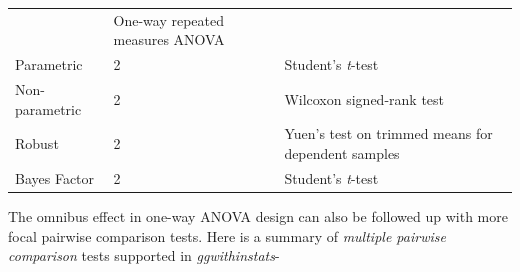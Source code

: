 \documentclass[]{article}
\begin{document}
\begin{longtable}[]{@{}lll@{}}
\begin{minipage}[t]{0.07\columnwidth}
\end{minipage} & \begin{minipage}[t]{0.59\columnwidth}\raggedright
One-way repeated measures ANOVA\strut
\end{minipage}\tabularnewline
\begin{minipage}[t]{0.26\columnwidth}\raggedright
Parametric\strut
\end{minipage} & \begin{minipage}[t]{0.07\columnwidth}\raggedright
2\strut
\end{minipage} & \begin{minipage}[t]{0.59\columnwidth}\raggedright
Student's \emph{t}-test\strut
\end{minipage}\tabularnewline
\begin{minipage}[t]{0.26\columnwidth}\raggedright
Non-parametric\strut
\end{minipage} & \begin{minipage}[t]{0.07\columnwidth}\raggedright
2\strut
\end{minipage} & \begin{minipage}[t]{0.59\columnwidth}\raggedright
Wilcoxon signed-rank test\strut
\end{minipage}\tabularnewline
\begin{minipage}[t]{0.26\columnwidth}\raggedright
Robust\strut
\end{minipage} & \begin{minipage}[t]{0.07\columnwidth}\raggedright
2\strut
\end{minipage} & \begin{minipage}[t]{0.59\columnwidth}\raggedright
Yuen's test on trimmed means for dependent samples\strut
\end{minipage}\tabularnewline
\begin{minipage}[t]{0.26\columnwidth}\raggedright
Bayes Factor\strut
\end{minipage} & \begin{minipage}[t]{0.07\columnwidth}\raggedright
2\strut
\end{minipage} & \begin{minipage}[t]{0.59\columnwidth}\raggedright
Student's \emph{t}-test\strut
\end{minipage}\tabularnewline
\bottomrule
\end{longtable}

The omnibus effect in one-way ANOVA design can also be followed up with more
focal pairwise comparison tests. Here is a summary of \emph{multiple pairwise
comparison} tests supported in \emph{ggwithinstats}-
\end{document}
